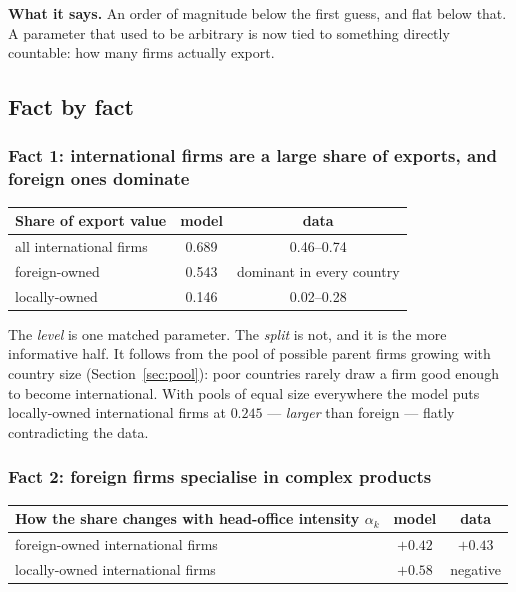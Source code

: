 \documentclass[11pt]{article}
\newcommand{\says}[1]{\smallskip\noindent\textbf{What it says.} #1\smallskip}
\theoremstyle{plain}
\theoremstyle{remark}
\theoremstyle{definition}
\begin{document}
\says{An order of magnitude below the first guess, and flat below that. A parameter
that used to be arbitrary is now tied to something directly countable: how many firms
actually export.}

\subsection{Fact by fact}

\subsubsection{Fact 1: international firms are a large share of exports, and foreign ones dominate}
\label{sec:fact1}

\begin{center}
\begin{tabular}{lcc}
\toprule
Share of export value & model & data\\
\midrule
all international firms & 0.689 & 0.46--0.74\\
\quad foreign-owned & 0.543 & dominant in every country\\
\quad locally-owned & 0.146 & 0.02--0.28\\
\bottomrule
\end{tabular}
\end{center}

The \emph{level} is one matched parameter. The \emph{split} is not, and it is the more
informative half. It follows from the pool of possible parent firms growing with
country size (Section~\ref{sec:pool}): poor countries rarely draw a firm good enough to
become international. With pools of equal size everywhere the model puts locally-owned
international firms at $0.245$ --- \emph{larger} than foreign --- flatly contradicting
the data.

\subsubsection{Fact 2: foreign firms specialise in complex products}
\label{sec:fact2}

\begin{center}
\begin{tabular}{lcc}
\toprule
How the share changes with head-office intensity $\alpha_k$ & model & data\\
\midrule
foreign-owned international firms & $+0.42$ & $+0.43$\\
locally-owned international firms & $+0.58$ & negative\\
\bottomrule
\end{tabular}
\end{center}
\end{document}
